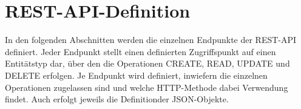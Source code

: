 \chapter{REST-API-Definition}
\label{sec:RESTAPIDefinition}

In den folgenden Abschnitten werden die einzelnen Endpunkte der REST-API definiert.
Jeder Endpunkt stellt einen definierten Zugriffspunkt auf einen Entitätstyp dar, über den die Operationen CREATE, READ, UPDATE und DELETE erfolgen. 
Je Endpunkt wird definiert, inwiefern die einzelnen Operationen zugelassen sind und welche HTTP-Methode dabei Verwendung findet. 
Auch erfolgt jeweils die Definitionder JSON-Objekte.






